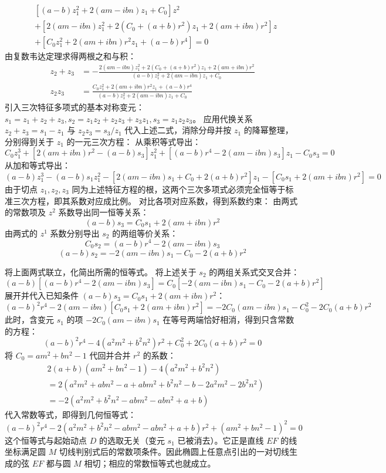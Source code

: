 \begin{solution}
\begin{align*}
&[ (a-b)z_1^2 + 2(am-ibn)z_1 + C_0 ] z^2 \\
&+ [ 2(am-ibn)z_1^2 + 2(C_0 + (a+b)r^2)z_1 + 2(am+ibn)r^2 ] z \\
&+ [ C_0 z_1^2 + 2(am+ibn)r^2 z_1 + (a-b)r^4 ] = 0
\end{align*}
由复数韦达定理求得两根之和与积：
\begin{align*}
z_2+z_3 &= -\frac{2(am-ibn)z_1^2 + 2(C_0 + (a+b)r^2)z_1 + 2(am+ibn)r^2}{(a-b)z_1^2 + 2(am-ibn)z_1 + C_0} \\
z_2 z_3 &= \frac{C_0 z_1^2 + 2(am+ibn)r^2 z_1 + (a-b)r^4}{(a-b)z_1^2 + 2(am-ibn)z_1 + C_0}
\end{align*}
引入三次特征多项式的基本对称变元：$s_1 = z_1+z_2+z_3, s_2 = z_1z_2+z_2z_3+z_3z_1, s_3 = z_1z_2z_3$。
应用代换关系 $z_2+z_3 = s_1 - z_1$ 与 $z_2 z_3 = s_3 / z_1$ 代入上述二式，消除分母并按 $z_1$ 的降幂整理，分别得到关于 $z_1$ 的一元三次方程：
从乘积等式导出：
\[ C_0 z_1^3 + [2(am+ibn)r^2 - (a-b)s_3]z_1^2 + [(a-b)r^4 - 2(am-ibn)s_3]z_1 - C_0 s_3 = 0 \]
从加和等式导出：
\[ (a-b) z_1^3 - (a-b) s_1 z_1^2 - [2(am-ibn)s_1 + C_0 + 2(a+b)r^2]z_1 - [C_0 s_1 + 2(am+ibn)r^2] = 0 \]
由于切点 $z_1, z_2, z_3$ 同为上述特征方程的根，这两个三次多项式必须完全恒等于标准三次方程，即其系数对应成比例。
对比各项对应系数，得到系数约束：
由两式的常数项及 $z^2$ 系数导出同一恒等关系：
\[ (a-b)s_3 = C_0 s_1 + 2(am+ibn)r^2 \]
由两式的 $z^1$ 系数分别导出 $s_2$ 的两组等价关系：
\[ C_0 s_2 = (a-b)r^4 - 2(am-ibn)s_3 \]
\[ (a-b) s_2 = -2(am-ibn)s_1 - C_0 - 2(a+b)r^2 \]

将上面两式联立，化简出所需的恒等式。
将上述关于 $s_2$ 的两组关系式交叉合并：
\[ (a-b)[(a-b)r^4 - 2(am-ibn)s_3] = C_0[-2(am-ibn)s_1 - C_0 - 2(a+b)r^2] \]
展开并代入已知条件 $(a-b)s_3 = C_0 s_1 + 2(am+ibn)r^2$：
\[ (a-b)^2 r^4 - 2(am-ibn)[C_0 s_1 + 2(am+ibn)r^2] = -2C_0(am-ibn)s_1 - C_0^2 - 2C_0(a+b)r^2 \]
此时，含变元 $s_1$ 的项 $-2C_0(am-ibn)s_1$ 在等号两端恰好相消，得到只含常数的方程：
\[ (a-b)^2 r^4 - 4(a^2 m^2 + b^2 n^2)r^2 + C_0^2 + 2C_0(a+b)r^2 = 0 \]
将 $C_0 = am^2+bn^2-1$ 代回并合并 $r^2$ 的系数：
\begin{align*}
& 2(a+b)(am^2+bn^2-1) - 4(a^2 m^2 + b^2 n^2) \\
&= 2(a^2 m^2 + abn^2 - a + abm^2 + b^2 n^2 - b - 2a^2 m^2 - 2b^2 n^2) \\
&= -2(a^2 m^2 + b^2 n^2 - abm^2 - abn^2 + a + b)
\end{align*}
代入常数等式，即得到几何恒等式：
\[ (a-b)^2 r^4 - 2(a^2m^2+b^2n^2 - abm^2 - abn^2 + a + b)r^2 + (am^2+bn^2-1)^2 = 0 \]
这个恒等式与起始动点 $D$ 的选取无关（变元 $s_1$ 已被消去）。它正是直线 $EF$ 的线坐标满足圆 $M$ 切线判别式后的常数项条件。因此椭圆上任意点引出的一对切线生成的弦 $EF$ 都与圆 $M$ 相切；相应的常数恒等式也就成立。


\end{solution}
